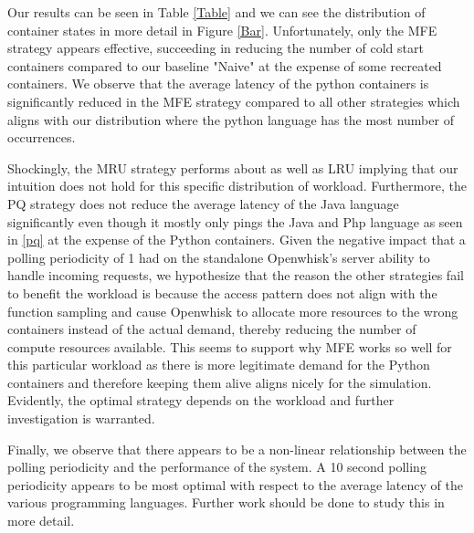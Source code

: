 \documentclass{article}
\begin{document}
Our results can be seen in Table \ref{Table} and we can see the distribution of container states in more detail in Figure \ref{Bar}. Unfortunately, only the MFE strategy appears effective, succeeding in reducing the number of cold start containers compared to our baseline "Naive" at the expense of some recreated containers. We observe that the average latency of the python containers is significantly reduced in the MFE strategy compared to all other strategies which aligns with our distribution where the python language has the most number of occurrences. 

Shockingly, the MRU strategy performs about as well as LRU implying that our intuition does not hold for this specific distribution of workload. Furthermore, the PQ strategy does not reduce the average latency of the Java language significantly even though it mostly only pings the Java and Php language as seen in \ref{pq} at the expense of the Python containers. Given the negative impact that a polling periodicity of 1 had on the standalone Openwhisk's server ability to handle incoming requests, we hypothesize that the reason the other strategies fail to benefit the workload is because the access pattern does not align with the function sampling and cause Openwhisk to allocate more resources to the wrong containers instead of the actual demand, thereby reducing the number of compute resources available. This seems to support why MFE works so well for this particular workload as there is more legitimate demand for the Python containers and therefore keeping them alive aligns nicely for the simulation. Evidently, the optimal strategy depends on the workload and further investigation is warranted.

Finally, we observe that there appears to be a non-linear relationship between the polling periodicity and the performance of the system. A 10 second polling periodicity appears to be most optimal with respect to the average latency of the various programming languages. Further work should be done to study this in more detail.
\end{document}
